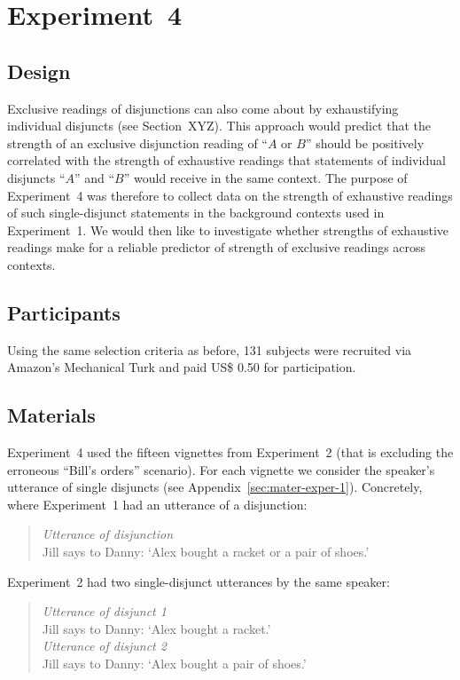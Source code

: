 \documentclass[12pt]{article}
\begin{document}
\section{Experiment~4}

\subsection{Design}

Exclusive readings of disjunctions can also come about by exhaustifying individual disjuncts
(see Section~XYZ). This approach would predict that the strength of an exclusive disjunction
reading of ``$A$ or $B$'' should be positively correlated with the strength of exhaustive
readings that statements of individual disjuncts ``$A$'' and ``$B$'' would receive in the same
context. The purpose of Experiment~4 was therefore to collect data on the strength of
exhaustive readings of such single-disjunct statements in the background contexts used in
Experiment~1. We would then like to investigate whether strengths of exhaustive readings make
for a reliable predictor of strength of exclusive readings across contexts.

\subsection{Participants}

Using the same selection criteria as before, 131 subjects were recruited via Amazon's
Mechanical Turk and paid US\$ 0.50 for participation.

\subsection{Materials}

Experiment~4 used the fifteen vignettes from Experiment~2 (that is excluding the erroneous
``Bill's orders'' scenario). For each vignette we consider the speaker's utterance of single
disjuncts (see Appendix~\ref{sec:mater-exper-1}). Concretely, where Experiment~1 had an
utterance of a disjunction:

\begin{quote}
  \emph{Utterance of disjunction}\\
  Jill says to Danny: `Alex bought a racket or a pair of shoes.'
\end{quote}

\noindent Experiment~2 had two single-disjunct utterances by the same speaker:

\begin{quote}
  \emph{Utterance of disjunct 1}\\
  Jill says to Danny: `Alex bought a racket.' \\[.2cm]
  \emph{Utterance of disjunct 2}\\
  Jill says to Danny: `Alex bought a pair of shoes.'
\end{quote}
\end{document}
